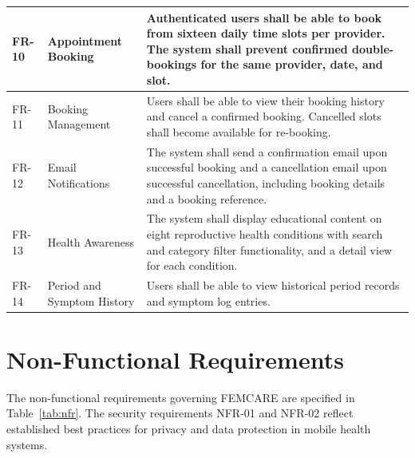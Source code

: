 \begin{table}[h!]
\begin{tabular}{|p{1.2cm}|p{3.5cm}|p{8cm}|}
\hline
FR-10 & Appointment Booking & Authenticated users shall be able to book from sixteen daily time slots per provider. The system shall prevent confirmed double-bookings for the same provider, date, and slot. \\
\hline
FR-11 & Booking Management & Users shall be able to view their booking history and cancel a confirmed booking. Cancelled slots shall become available for re-booking. \\
\hline
FR-12 & Email Notifications & The system shall send a confirmation email upon successful booking and a cancellation email upon successful cancellation, including booking details and a booking reference. \\
\hline
FR-13 & Health Awareness & The system shall display educational content on eight reproductive health conditions with search and category filter functionality, and a detail view for each condition. \\
\hline
FR-14 & Period and Symptom History & Users shall be able to view historical period records and symptom log entries. \\
\hline
\end{tabular}
\end{table}

\section{Non-Functional Requirements}
\label{sec:nonfunctional}

The non-functional requirements governing FEMCARE are specified in Table~\ref{tab:nfr}. The security requirements NFR-01 and NFR-02 reflect established best practices for privacy and data protection in mobile health systems. \cite{kotz2016}

